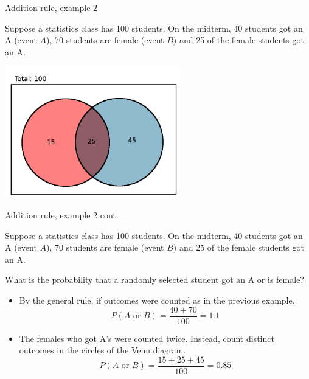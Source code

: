 \documentclass[xcolor=table]{beamer}
\begin{document}
\begin{frame}{Addition rule, example 2}
\begin{block}{}
Suppose a statistics class has 100 students. On the midterm, 40 students got an A (event $A$),  70 students are female (event $B$) and 25 of the female students got an A.
\end{block}

{\centering
\includegraphics[width=3in]{../images/ch4_venn_ovr_ex}\par
}
\end{frame}

\begin{frame}{Addition rule, example 2 cont.}
\begin{block}{}
Suppose a statistics class has 100 students. On the midterm, 40 students got an A (event $A$),  70 students are female (event $B$) and 25 of the female students got an A.
\end{block}
\begin{exampleblock}{}
What is the probability that a randomly selected student got an A or is female?
\begin{itemize}
\pause
\item By the general rule, if outcomes were counted as in the previous example,
\[P(A \text{ or } B) = \frac {40 + 70}{100} = 1.1\]

\pause
\item The females who got A's were counted twice. Instead, count distinct outcomes in the circles of the Venn diagram.
\[P(A \text{ or } B) = \frac {15 + 25 + 45}{100} = 0.85\]

\end{itemize}
\end{exampleblock}

\end{frame}
\end{document}
